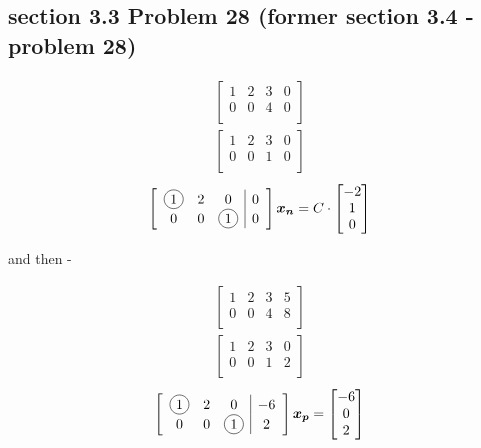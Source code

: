 \documentclass[a4paper,11pt]{article}
\newcommand*\circled[1]{\tikz[baseline=(char.base)]{
             \node[shape=circle,draw,inner sep=2pt] (char) {#1};}}
\newcommand{\mybf}[1]{\boldsymbol{#1}}
\begin{document}
\subsection*{section 3.3 Problem 28 (former section 3.4 - problem 28)}
\begin{align*}
\left[
\begin{array}{ccc|c}
1 & 2 & 3 & 0 \\
0 & 0 & 4 & 0 \\
\end{array}
\right]
\end{align*}
\begin{align*}
\left[
\begin{array}{ccc|c}
1 & 2 & 3 & 0 \\
0 & 0 & 1 & 0 \\
\end{array}
\right]
\end{align*}
\begin{align*}
\left[
\begin{array}{ccc|c}
\circled{1} & 2 & 0 			& 0 \\
0 			& 0 & \circled{1} 	& 0 \\
\end{array}
\right]
\mybf{x_n}=
C \cdot
\begin{bmatrix}
-2 \\
1 \\
0 \\
\end{bmatrix}
\end{align*}

and then - 

\begin{align*}
\left[
\begin{array}{ccc|c}
1 & 2 & 3 & 5 \\
0 & 0 & 4 & 8 \\
\end{array}
\right]
\end{align*}
\begin{align*}
\left[
\begin{array}{ccc|c}
1 & 2 & 3 & 0 \\
0 & 0 & 1 & 2 \\
\end{array}
\right]
\end{align*}
\begin{align*}
\left[
\begin{array}{ccc|c}
\circled{1} & 2 & 0 			& -6 \\
0 			& 0 & \circled{1} 	& 2 \\
\end{array}
\right]
\mybf{x_p}=
\begin{bmatrix}
-6 \\
0 \\
2 \\
\end{bmatrix}
\end{align*}
\end{document}

